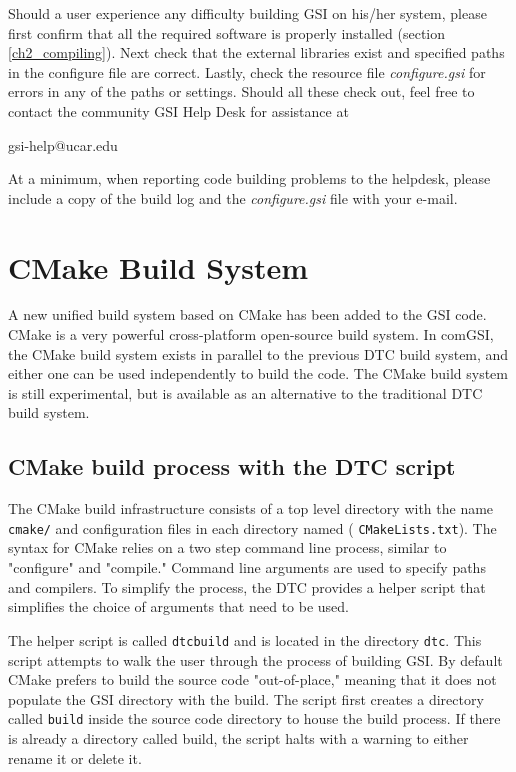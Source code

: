 Should a user experience any difficulty building GSI on his/her system, please first confirm that 
all the required software is properly installed (section \ref{ch2_compiling}). Next check that the 
external libraries exist and specified paths in the configure file are correct. Lastly, 
check the resource file \textit{configure.gsi} for errors in any of the paths or settings. Should 
all these check out, feel free to contact the community GSI Help Desk for assistance at 
\begin{center}
{gsi-help@ucar.edu}
\end{center}

At a minimum, when reporting code building problems to the helpdesk, please include a copy of the build log and the \textit{configure.gsi} file with your e-mail.

\section{CMake Build System}  \label{ch2_cmake}

A new unified build system based on CMake has been added to the GSI code.
CMake is a very powerful cross-platform open-source build system. In comGSI, the CMake build system exists in parallel 
to the previous DTC build system, and either one can be used independently to build the code. 
The CMake build system is still experimental, but is available as an alternative to the traditional DTC build system. 

\subsection{CMake build process with the DTC script}
The CMake build infrastructure consists of a top level directory with the name \verb|cmake/| and configuration files in each directory named ( \verb|CMakeLists.txt|). The syntax for CMake relies on a two step command line process, similar to "configure" and "compile." Command line arguments are used to specify paths and compilers. To simplify the process, the DTC provides a helper script that simplifies the choice of arguments that need to be used.  

The helper script is called \verb|dtcbuild| and is located in the directory \verb|dtc|. This script attempts to walk the user through the process of building GSI. By default CMake prefers to build the source code "out-of-place," meaning that it does not populate the GSI directory with the build. The script first creates a directory called \verb|build| inside the source code directory to house the build process. If there is already a directory called build, the script halts with a warning to either rename it or delete it. 

